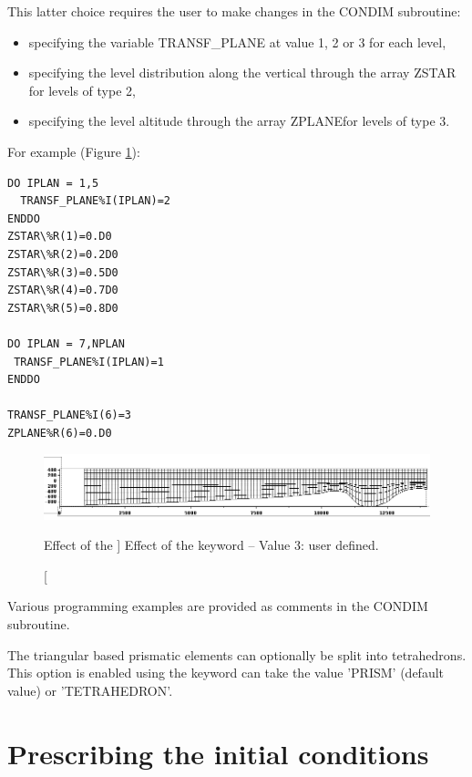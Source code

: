This latter choice requires the user to make changes in the CONDIM
subroutine:

\begin{itemize}
\item specifying the variable TRANSF\_PLANE at value 1, 2 or 3 for each level,

\item specifying the level distribution along the vertical through the array
ZSTAR for levels of type 2,

\item specifying the level altitude through the array ZPLANEfor levels of type
3.
\end{itemize}

For example (Figure \ref{fig:mesh_transf3}):
\begin{lstlisting}[language=TelFortran]
DO IPLAN = 1,5
  TRANSF_PLANE%I(IPLAN)=2
ENDDO
ZSTAR\%R(1)=0.D0
ZSTAR\%R(2)=0.2D0
ZSTAR\%R(3)=0.5D0
ZSTAR\%R(4)=0.7D0
ZSTAR\%R(5)=0.8D0

DO IPLAN = 7,NPLAN
 TRANSF_PLANE%I(IPLAN)=1
ENDDO

TRANSF_PLANE%I(6)=3
ZPLANE%R(6)=0.D0
\end{lstlisting}

\begin{figure}[H]%
\begin{center}
%
  \includegraphics[width=\textwidth]{./graphics/mesh_transformation3}
%
\end{center}
\caption
[Effect of the ]
{Effect of the  keyword -- Value 3: user defined.}
\label{fig:mesh_transf3}
\end{figure}

Various programming examples are provided as comments in the CONDIM
subroutine.

The triangular based prismatic elements can optionally be split into
tetrahedrons. This option is enabled using the  keyword can
take the value 'PRISM' (default value) or 'TETRAHEDRON'.


\section{Prescribing the initial conditions}


